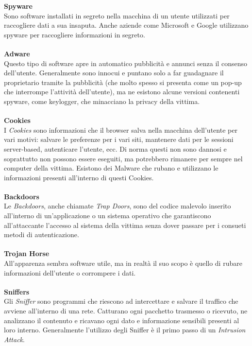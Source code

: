 \textbf{Spyware}\\
Sono software installati in segreto nella macchina di un utente utilizzati per raccogliere dati a sua insaputa. Anche aziende come Microsoft e Google utilizzano spyware per raccogliere informazioni in segreto\cite{malware}.\\
\\
\textbf{Adware}\\
Questo tipo di software apre in automatico pubblicità e annunci senza il consenso dell'utente. Generalmente sono innocui e puntano solo a far guadagnare il proprietario tramite la pubblicità (che molto spesso si presenta come un pop-up che interrompe l'attività dell'utente), ma ne esistono alcune versioni contenenti spyware, come keylogger, che minacciano la privacy della vittima.\\ 
\\
\textbf{Cookies}\\
I \textit{Cookies} sono informazioni che il browser salva nella macchina dell'utente per vari motivi: salvare le preferenze per i vari siti, mantenere dati per le sessioni server-based, autenticare l'utente, ecc. Di norma questi non sono dannosi e soprattutto non possono essere eseguiti, ma potrebbero rimanere per sempre nel computer della vittima. Esistono dei Malware che rubano e utilizzano le informazioni presenti all'interno di questi Cookies.\\
\\
\textbf{Backdoors}\\
Le \textit{Backdoors}, anche chiamate \textit{Trap Doors}, sono del codice malevolo inserito all'interno di un'applicazione o un sistema operativo che garantiscono all'attaccante l'accesso al sistema della vittima senza dover passare per i consueti metodi di autenticazione.\\
\\
\textbf{Trojan Horse}\\
All'apparenza sembra software utile, ma in realtà il suo scopo è quello di rubare informazioni dell'utente o corrompere i dati.\\
\\
\textbf{Sniffers}\\
Gli \textit{Sniffer} sono programmi che riescono ad intercettare e salvare il traffico che avviene all'interno di una rete. Catturano ogni pacchetto trasmesso o ricevuto, ne analizzano il contenuto e ricavano ogni dato e informazione sensibili presenti al loro interno. Generalmente l'utilizzo degli Sniffer è il primo passo di un \textit{Intrusion Attack}.\\
